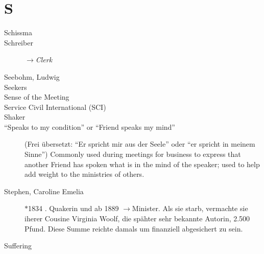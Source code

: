 \section*{S}

\articlesize

\begin{description}
 \item[Schissma]

 \item[Schreiber] $\to$\textit{Clerk}

 \item[Seebohm, Ludwig] 

 \item[Seekers]

 \item[Sense of the Meeting]

 \item[Service Civil International (SCI)]

 \item[Shaker]

 \item["`Speaks to my condition"' or "`Friend speaks my mind"'] (Frei übersetzt: "`Er spricht mir aus der Seele"' oder "`er spricht in meinem Sinne"')
    Commonly used during meetings for business to express that another Friend has spoken what is in the mind of the speaker; used to help add weight to the ministries of others.

 \item[Stephen, Caroline Emelia] $\ast$1834 . Quakerin und ab 1889
 $\to$Minister. Als sie starb, vermachte sie iherer Cousine Virginia Woolf,
 die spähter sehr bekannte Autorin, 2.500 Pfund. Diese Summe reichte damals um
 finanziell abgesichert zu sein. 

 \item[Suffering]

 \end{description}

\normalsize
